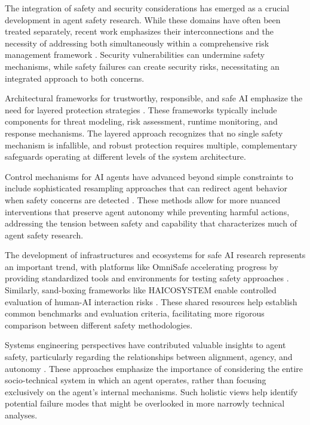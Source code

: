 \documentclass[conference]{IEEEtran}
\begin{document}
The integration of safety and security considerations has emerged as a crucial development in agent safety research. While these domains have often been treated separately, recent work emphasizes their interconnections and the necessity of addressing both simultaneously within a comprehensive risk management framework \cite{2405.19524}. Security vulnerabilities can undermine safety mechanisms, while safety failures can create security risks, necessitating an integrated approach to both concerns.

Architectural frameworks for trustworthy, responsible, and safe AI emphasize the need for layered protection strategies \cite{2408.12935}. These frameworks typically include components for threat modeling, risk assessment, runtime monitoring, and response mechanisms. The layered approach recognizes that no single safety mechanism is infallible, and robust protection requires multiple, complementary safeguards operating at different levels of the system architecture.

Control mechanisms for AI agents have advanced beyond simple constraints to include sophisticated resampling approaches that can redirect agent behavior when safety concerns are detected \cite{2504.10374}. These methods allow for more nuanced interventions that preserve agent autonomy while preventing harmful actions, addressing the tension between safety and capability that characterizes much of agent safety research.

The development of infrastructures and ecosystems for safe AI research represents an important trend, with platforms like OmniSafe accelerating progress by providing standardized tools and environments for testing safety approaches \cite{2305.09304}. Similarly, sand-boxing frameworks like HAICOSYSTEM enable controlled evaluation of human-AI interaction risks \cite{2409.16427}. These shared resources help establish common benchmarks and evaluation criteria, facilitating more rigorous comparison between different safety methodologies.

Systems engineering perspectives have contributed valuable insights to agent safety, particularly regarding the relationships between alignment, agency, and autonomy \cite{2503.05748}. These approaches emphasize the importance of considering the entire socio-technical system in which an agent operates, rather than focusing exclusively on the agent's internal mechanisms. Such holistic views help identify potential failure modes that might be overlooked in more narrowly technical analyses.
\end{document}

